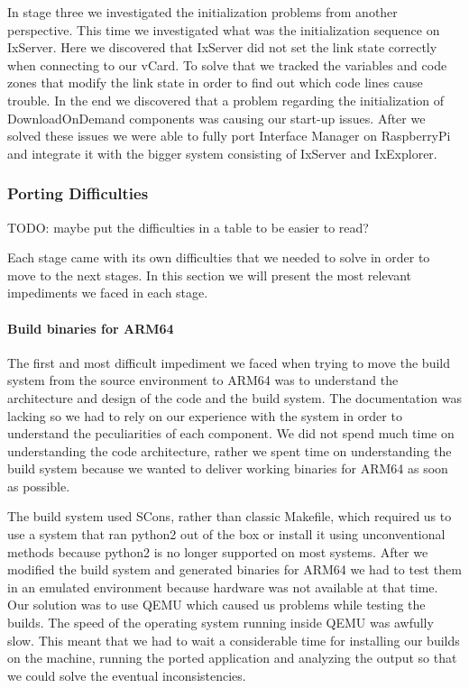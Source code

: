 In stage three we investigated the initialization problems from another
perspective. This time we investigated what was the initialization sequence on
IxServer. Here we discovered that IxServer did not set the link state correctly
when connecting to our vCard. To solve that we tracked the variables and code
zones that modify the link state in order to find out which code lines cause
trouble. In the end we discovered that a problem regarding the initialization
of DownloadOnDemand components was causing our start-up issues. After we solved
these issues we were able to fully port Interface Manager on RaspberryPi and
integrate it with the bigger system consisting of IxServer and IxExplorer.

\subsubsection{Porting Difficulties}

TODO: maybe put the difficulties in a table to be easier to read?

Each stage came with its own difficulties that we needed to solve in order to
move to the next stages. In this section we will present the most relevant
impediments we faced in each stage.

\paragraph{Build binaries for ARM64}

The first and most difficult impediment we faced when trying to move the build
system from the source environment to ARM64 was to understand the architecture
and design of the code and the build system. The documentation was lacking so
we had to rely on our experience with the system in order to understand the
peculiarities of each component. We did not spend much time on understanding the
code architecture, rather we spent time on understanding the build system
because we wanted to deliver working binaries for ARM64 as soon as possible.

The build system used SCons, rather than classic Makefile, which required us to
use a system that ran python2 out of the box or install it using unconventional
methods because python2 is no longer supported on most systems. After we
modified the build system and generated binaries for ARM64 we had to test them
in an emulated environment because hardware was not available at that time. Our
solution was to use QEMU which caused us problems while testing the builds.
The speed of the operating system running inside QEMU was awfully slow. This
meant that we had to wait a considerable time for installing our builds on the
machine, running the ported application and analyzing the output so that we
could solve the eventual inconsistencies.

